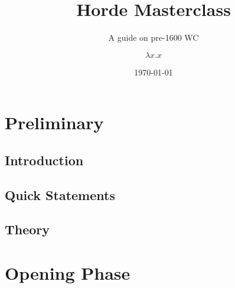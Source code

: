 \documentclass{beamer}
\title{Horde Masterclass}
\subtitle{A guide on pre-1600 WC}
\author{$\lambda x. x$}
\date{\today}
\begin{document}
\begin{frame}
  \titlepage
\end{frame}

\section{Preliminary}
\subsection{Introduction}


\subsection{Quick Statements}


\subsection{Theory}


\section{Opening Phase}

\end{document}

